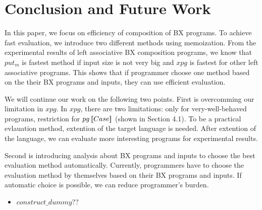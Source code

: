 \section{Conclusion and Future Work}

In this paper, we focus on efficiency of composition of BX programs.
To achieve fast evaluation, we introduce two different methods using memoization.
From the experimental results of left associative BX composition programs, we know that $put_m$ is fastest method if input size is not very big and $xpg$ is fastest for other left associative programs.
This shows that if programmer choose one method based on the their BX programs and inputs, they can use efficient evaluation. 


We will continue our work on the following two points.
First is overcomming our limitation in $xpg$. In $xpg$, there are two limitations: only for very-well-behaved programs, restriction for $pg \, [\![Case]\!]$ (shown in Section 4.1). To be a practical evlauation method, extention of the target language is needed. After extention of the language, we can evaluate more interesting programs for experimental results.

Second is introducing analysis about BX programs and inputs to choose the best evaluation method automatically.
Currently, programmers have to choose the evaluation method by themselves based on their BX programs and inputs. If automatic choice is possible, we can reduce programmer's burden.


\begin{itemize}
\item $construct\_dummy$??
\end{itemize}







